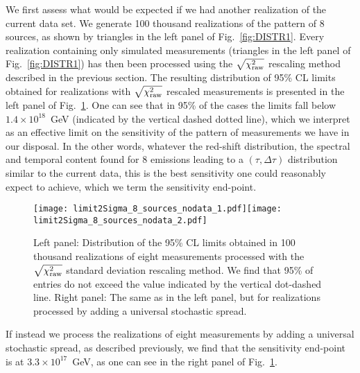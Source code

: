 \documentclass[12pt]{article}
\begin{document}
{We first assess what would be expected if we had another realization of the current data set.
We generate 100 thousand realizations of the pattern of  8 sources, as shown by triangles in the left panel of Fig.~\ref{fig:DISTR1}.
Every realization containing only simulated measurements (triangles in the left panel of Fig.~\ref{fig:DISTR1})
has then been processed using the $\sqrt{\chi_{\rm raw}^2}$ rescaling method described in the previous section.
The resulting distribution of 95\% CL limits obtained for realizations
with  $\sqrt{\chi_{\rm raw}^2}$ rescaled measurements is presented in the left panel of Fig.~\ref{fig:limitsDISTR1}.
One can see that in 95\% of the cases the limits fall below $1.4\times 10^{18}$~GeV (indicated by the vertical dashed dotted line), which
we interpret as an effective limit on the sensitivity of the pattern of measurements we have in our disposal.
In the other words, whatever the red-shift distribution, the spectral and temporal content found for 8 emissions
leading to a $(\tau , \Delta\tau )$ distribution similar to the current data, this is
the best sensitivity one could reasonably expect to achieve, which we term the sensitivity end-point.

\begin{figure}
\centering
\texttt{[image: limit2Sigma\_8\_sources\_nodata\_1.pdf]}\hspace{0cm}\texttt{[image: limit2Sigma\_8\_sources\_nodata\_2.pdf]}
\caption{Left panel: Distribution of the 95\% CL limits obtained in 100 thousand realizations of eight measurements
processed with the $\sqrt{\chi_{\rm raw}^2}$ standard deviation rescaling method. We find that
95\% of entries do not exceed the value indicated by the vertical dot-dashed line.
Right panel: The same as in the left panel, but for realizations processed by adding a universal stochastic spread.}
\label{fig:limitsDISTR1}
\end{figure}

If instead we process the realizations of eight measurements by adding a universal stochastic spread,
as described previously, we find
that the sensitivity end-point is at $3.3\times 10^{17}$~GeV,
as one can see in the right panel of Fig.~\ref{fig:limitsDISTR1}.

}
\end{document}
